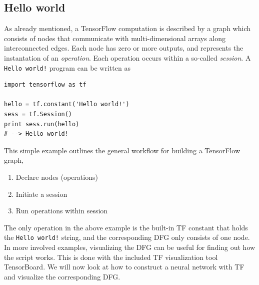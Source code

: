 \documentclass[twoside,english]{uiofysmaster}
\begin{document}
\subsection{Hello world}
As already mentioned, a TensorFlow computation
is described by a graph which consists of nodes
that communicate with multi-dimensional arrays along
interconnected edges. Each node has zero or more
outputs, and represents the instantation
of an \textit{operation}. Each operation
occurs within a so-called \textit{session}. 
A \texttt{Hello world!} program can be written as
\begin{verbatim}
import tensorflow as tf

hello = tf.constant('Hello world!')
sess = tf.Session()
print sess.run(hello)
# --> Hello world!
\end{verbatim}
This simple example outlines the general
workflow for building a TensorFlow graph,
\begin{enumerate}
 \item Declare nodes (operations)
 \item Initiate a session
 \item Run operations within session
\end{enumerate}
The only operation in the above example
is the built-in TF constant that holds the 
\texttt{Hello world!} string, and the 
corresponding DFG only consists of one node. 
In more involved examples, visualizing 
the DFG can be useful for finding out how 
the script works. This is done with the 
included TF visualization tool TensorBoard.
We will now look at how to construct a neural network with TF and
visualize the corresponding DFG. 
\end{document}
